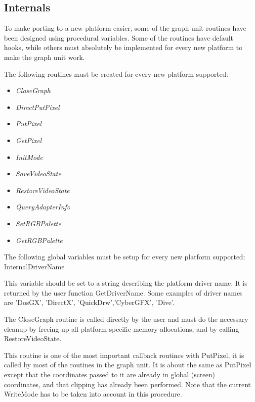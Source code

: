 \subsection{Internals}

To make porting to a new platform easier, some of the graph unit routines
have been designed using procedural variables. Some of the routines have
default hooks, while others must absolutely be implemented for every new
platform to make the graph unit work.

The following routines must be created for every new platform supported:

\begin{itemize}
\item \textit{CloseGraph}
\item \textit{DirectPutPixel}
\item \textit{PutPixel}
\item \textit{GetPixel}
\item \textit{InitMode}
\item \textit{SaveVideoState}
\item \textit{RestoreVideoState}
\item \textit{QueryAdapterInfo}
\item \textit{SetRGBPalette}
\item \textit{GetRGBPalette}
\end{itemize}

The following global variables must be setup for every new platform
supported:
 InternalDriverName


This variable should be set to a string describing the platform driver
name. It is returned by the user function GetDriverName. Some examples
of driver names are 'DosGX', 'DirectX', 'QuickDrw','CyberGFX', 'Dive'.





The CloseGraph routine is called directly by the user and must
do the necessary cleanup by freeing up all platform specific
memory allocations, and by calling RestoreVideoState.


This routine is one of the most important callback routines with
PutPixel, it is called by most of the routines in the graph unit. It
is about the same as PutPixel except that the coordinates passed to
it are already in global (screen) coordinates, and that clipping has
already been performed. Note that the current WriteMode has to be taken
into account in this procedure.

